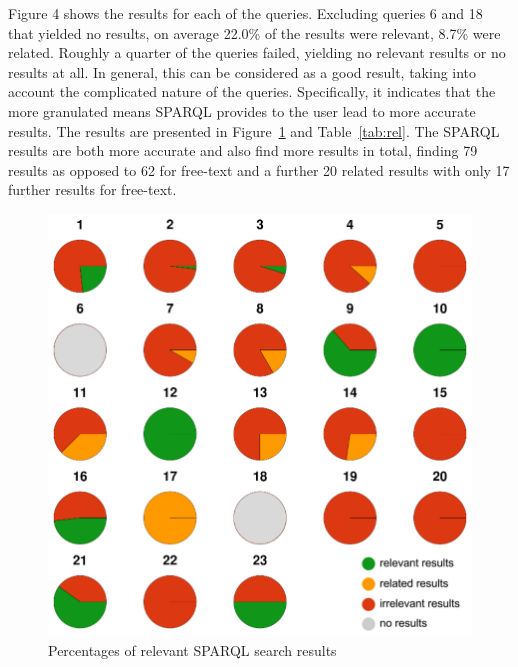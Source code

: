 \documentclass[smallextended]{svjour3}       %
\begin{document}
Figure 4 shows the results for each of the queries. Excluding queries 6 and 18
that yielded no results, on average 22.0\% of the results were relevant, 8.7\%
were related. Roughly a quarter of the queries
failed, yielding no relevant results or no results at all. In general, this can
be considered as a good result, taking into account the complicated nature of
the queries. Specifically, it indicates that the more granulated means SPARQL
provides to the user lead to more accurate results. The results are presented in
Figure~\ref{fig:sparql-rel} and Table~\ref{tab:rel}. The SPARQL results are both
more accurate and also find more results in total, finding 79 results as opposed
to 62 for free-text and a further 20 related results with only 17 further
results for free-text.

\begin{figure}
    \includegraphics[width=\textwidth]{eval_rel_sparql.png}
    \caption{\label{fig:sparql-rel}Percentages of relevant SPARQL search results}
\end{figure}
\end{document}
